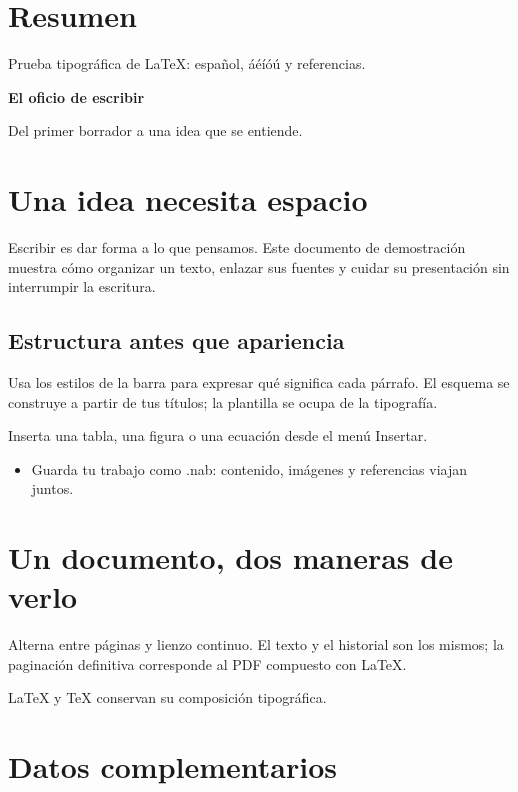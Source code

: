 \documentclass[12pt,a4paper,oneside,openany]{report}
\begin{document}
\chapter*{Resumen}
Prueba tipográfica de \LaTeX{}: español, áéíóú y referencias.
\fontsize{12.0}{14.399999999999999}\selectfont
{\LARGE\bfseries El oficio de escribir\par}

{\large Del primer borrador a una idea que se entiende.\par}

\chapter{Una idea necesita espacio}\label{bAD694EE6-5445-4C8C-B4C6-60B27B440AE0}

Escribir es dar forma a lo que pensamos. Este documento de demostración muestra cómo organizar un texto, enlazar sus fuentes y cuidar su presentación sin interrumpir la escritura.

\section{Estructura antes que apariencia}\label{bC99A71E5-0CCD-412B-84F4-F0D0838E62E3}

Usa los estilos de la barra para expresar qué significa cada párrafo. El esquema se construye a partir de tus títulos; la plantilla se ocupa de la tipografía.

Inserta una tabla, una figura o una ecuación desde el menú Insertar.

\begin{itemize}
\item Guarda tu trabajo como .nab: contenido, imágenes y referencias viajan juntos.

\end{itemize}
\chapter{Un documento, dos maneras de verlo}\label{b4B3EFB2D-E8F5-498A-A0C0-59ABB5014B69}

Alterna entre páginas y lienzo continuo. El texto y el historial son los mismos; la paginación definitiva corresponde al PDF compuesto con \LaTeX{}.

\LaTeX{} y \TeX{} conservan su composición tipográfica.

\appendix
\chapter{Datos complementarios}\label{b941AEF8A-FFA0-4FD7-AC54-F2CC1871DD6A}
\end{document}

